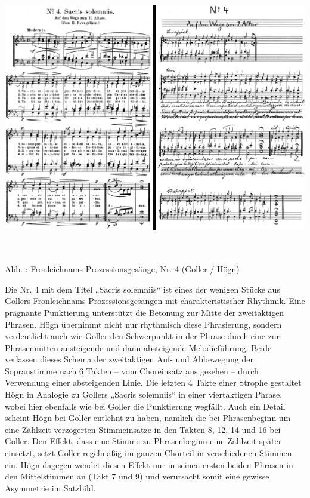 \documentclass[a4paper]{article}
\newcounter{Abb}
\renewcommand\theAbb{\arabic{Abb}}
\begin{document}
\includegraphics[width=15.967cm,height=11.947cm]{pictures/zulassungsarbeit-img083.png}


Abb. \stepcounter{Abb}{\theAbb}: Fronleichnams-Prozessionsgesänge, Nr. 4
(Goller / Högn)

Die Nr. 4 mit dem Titel „Sacris solemniis“ ist eines der wenigen Stücke
aus Gollers Fronleichnams-Prozessionsgesängen mit charakteristischer
Rhythmik. Eine prägnante Punktierung unterstützt die Betonung zur Mitte
der zweitaktigen Phrasen. Högn übernimmt nicht nur rhythmisch diese
Phrasierung, sondern verdeutlicht auch wie Goller den Schwerpunkt in
der Phrase durch eine zur Phrasenmitten ansteigende und dann
absteigende Melodieführung. Beide verlassen dieses Schema der
zweitaktigen Auf- und Abbewegung der Sopranstimme nach 6 Takten – vom
Choreinsatz aus gesehen – durch Verwendung einer absteigenden Linie.
Die letzten 4 Takte einer Strophe gestaltet Högn in Analogie zu Gollers
„Sacris solemniis“ in einer viertaktigen Phrase, wobei hier ebenfalls
wie bei Goller die Punktierung wegfällt. Auch ein Detail scheint Högn
bei Goller entlehnt zu haben, nämlich die bei Phrasenbeginn um eine
Zählzeit verzögerten Stimmeinsätze in den Takten 8, 12, 14 und 16 bei
Goller. Den Effekt, dass eine Stimme zu Phrasenbeginn eine Zählzeit
später einsetzt, setzt Goller regelmäßig im ganzen Chorteil in
verschiedenen Stimmen ein. Högn dagegen wendet diesen Effekt nur in
seinen ersten beiden Phrasen in den Mittelstimmen an (Takt 7 und 9) und
verursacht somit eine gewisse Asymmetrie im Satzbild.
\end{document}
